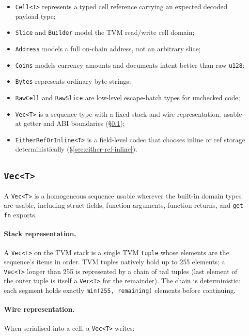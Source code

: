 \documentclass[12pt,oneside]{article}
\begin{document}
\begin{itemize}
\item \verb|Cell<T>| represents a typed cell reference carrying an expected
decoded payload type;
\item \verb|Slice| and \verb|Builder| model the TVM read/write cell domain;
\item \verb|Address| models a full on-chain address, not an arbitrary slice;
\item \verb|Coins| models currency amounts and documents intent better than raw
\verb|u128|;
\item \verb|Bytes| represents ordinary byte strings;
\item \verb|RawCell| and \verb|RawSlice| are low-level escape-hatch types for
unchecked code;
\item \verb|Vec<T>| is a sequence type with a fixed stack and wire
representation, usable at getter and ABI boundaries
(\S\ref{sec:vec-type});
\item \verb|EitherRefOrInline<T>| is a field-level codec that chooses inline
or ref storage deterministically (\S\ref{sec:either-ref-inline}).
\end{itemize}

\subsection{\texttt{Vec<T>}}
\label{sec:vec-type}
A \verb|Vec<T>| is a homogeneous sequence usable wherever the built-in
domain types are usable, including struct fields, function arguments,
function returns, and \verb|get fn| exports.

\paragraph{Stack representation.}
A \verb|Vec<T>| on the TVM stack is a single TVM \verb|Tuple| whose elements
are the sequence's items in order. TVM tuples natively hold up to 255
elements; a \verb|Vec<T>| longer than 255 is represented by a chain of tail
tuples (last element of the outer tuple is itself a \verb|Vec<T>| for the
remainder). The chain is deterministic: each segment holds exactly
\verb|min(255, remaining)| elements before continuing.

\paragraph{Wire representation.}
When serialised into a cell, a \verb|Vec<T>| writes:
\end{document}
